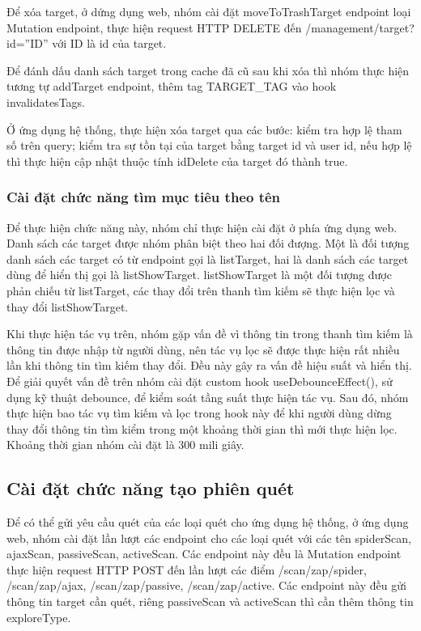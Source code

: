 Để xóa target, ở dứng dụng web, nhóm cài đặt moveToTrashTarget endpoint loại Mutation endpoint, thực hiện request HTTP DELETE đến /management/target?id=”ID” với ID là id của target.

Để đánh dấu danh sách target trong cache đã cũ sau khi xóa thì nhóm thực hiện tương tự addTarget endpoint, thêm tag TARGET\_TAG vào hook invalidatesTags.

Ở ứng dụng hệ thống, thực hiện xóa target qua các bước: kiểm tra hợp lệ tham số trên query; kiểm tra sự tồn tại của target bằng target id và user id, nếu hợp lệ thì thực hiện cập nhật thuộc tính idDelete của target đó thành true.

\subsubsection{Cài đặt chức năng tìm mục tiêu theo tên}

\tab Để thực hiện chức năng này, nhóm chỉ thực hiện cài đặt ở phía ứng dụng web. Danh sách các target được nhóm phân biệt theo hai đối đượng. Một là đối tượng danh sách các target có từ endpoint gọi là listTarget, hai là danh sách các target dùng để hiển thị gọi là listShowTarget. listShowTarget là một đối tượng được phản chiếu từ listTarget, các thay đổi trên thanh tìm kiếm sẽ thực hiện lọc và thay đổi listShowTarget.

Khi thực hiện tác vụ trên, nhóm gặp vấn đề vì thông tin trong thanh tìm kiếm là thông tin được nhập từ người dùng, nên tác vụ lọc sẽ được thực hiện rất nhiều lần khi thông tin tìm kiếm thay đổi. Đều này gây ra vấn đề hiệu suất và hiển thị. Để giải quyết vấn đề trên nhóm cài đặt custom hook useDebounceEffect(), sử dụng kỹ thuật debounce, để kiểm soát tầng suất thực hiện tác vụ. Sau đó, nhóm thực hiện bao tác vụ tìm kiếm và lọc trong hook này để khi người dùng dừng thay đổi thông tin tìm kiểm trong một khoảng thời gian thì mới thực hiện lọc. Khoảng thời gian nhóm cài đặt là 300 mili giây.

\subsection{Cài đặt chức năng tạo phiên quét}

\tab Để có thể gửi yêu cầu quét của các loại quét cho ứng dụng hệ thống, ở ứng dụng web, nhóm cài đặt lần lượt các endpoint cho các loại quét với các tên spiderScan, ajaxScan, passiveScan, activeScan. Các endpoint này đều là Mutation endpoint thực hiện request HTTP POST đến lần lượt các điểm /scan/zap/spider, /scan/zap/ajax, /scan/zap/passive, /scan/zap/active. Các endpoint này đều gửi thông tin target cần quét, riêng passiveScan và activeScan thì cần thêm thông tin exploreType.

